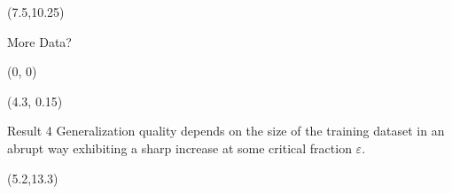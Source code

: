 \documentclass[final]{beamer}
\begin{document}
\begin{textblock}{7.3}(7.5,10.25)
    \begin{block}{More Data?}
        \begin{textblock}{4.5}(0, 0)
        \begin{figure}[h]
            \center
            
        \end{figure}
        \end{textblock}

        \begin{textblock}{2.7}(4.3, 0.15)
        \begin{alertblock}{Result 4}
            Generalization quality depends on the size of the training dataset
            in an abrupt way exhibiting a sharp increase at some critical
            fraction $\varepsilon$.
        \end{alertblock} 
        \end{textblock}
    \end{block}
\end{textblock}

\begin{textblock}{4.6}(5.2,13.3)
    \center
\end{textblock}
\end{document}
